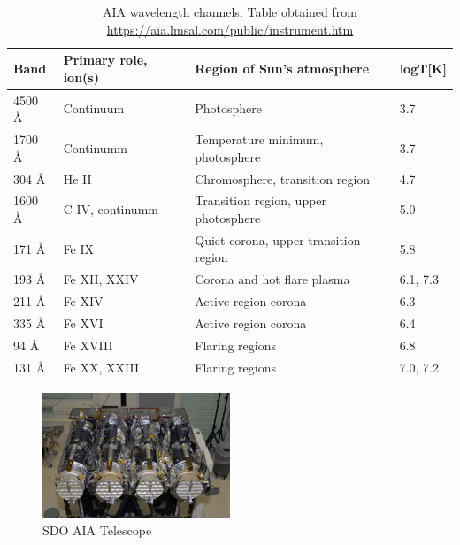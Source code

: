 \begin{table}[h!]
    \centering
      \setlength{\tabcolsep}{10pt}
      \renewcommand{\arraystretch}{1.5}
    \begin{tabular}{| l | l | l | l |}
      \hline
       \textbf{Band} & \textbf{Primary role, ion(s)} & \textbf{Region of Sun's atmosphere} & \textbf{logT{[}K{]}} \\
      \hline
      4500 Å & Continuum            & Photosphere                                            & 3.7                                   \\
      \hline
      1700 Å & Continumm            & Temperature minimum, photosphere                       & 3.7                                   \\
      \hline
      304 Å  & He II                & Chromosphere, transition region                        & 4.7                                   \\
      \hline
      1600 Å & C IV, continumm      & Transition region, upper photosphere                   & 5.0                                   \\
      \hline
      171 Å  & Fe IX                & Quiet corona, upper transition region                  & 5.8                                   \\
      \hline
      193 Å  & Fe XII, XXIV         & Corona and hot flare plasma                            & 6.1, 7.3                              \\
      \hline
      211 Å  & Fe XIV               & Active region corona                                   & 6.3                                   \\
      \hline
      335 Å  & Fe XVI               & Active region corona                                   & 6.4                                   \\
      \hline
      94 Å   & Fe XVIII             & Flaring regions                                        & 6.8                                   \\
      \hline
      131 Å  & Fe XX, XXIII         & Flaring regions                                        & 7.0, 7.2                              \\
      \hline
    \end{tabular}
    \caption{AIA wavelength channels. Table obtained from \url{https://aia.lmsal.com/public/instrument.htm}}
    \label{tab:aia_wav_channels}
\end{table}

\begin{figure}[h!]
    \centering
    \includegraphics[width=0.5\textwidth]{images/SDO AIA Telescopes.jpg}
    \caption[AIA Telescopes]{SDO AIA Telescope }
    \label{fig:aia_telescopes}
\end{figure}

